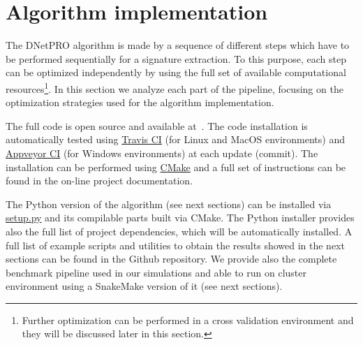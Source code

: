 \documentclass{standalone}
\begin{document}
\section[DNetPRO Implementation]{Algorithm implementation}\label{implementation:implementation}

The \textsf{DNetPRO} algorithm is made by a sequence of different steps which have to be performed sequentially for a signature extraction.
To this purpose, each step can be optimized independently by using the full set of available computational resources\footnote{
  Further optimization can be performed in a cross validation environment and they will be discussed later in this section.
}.
In this section we analyze each part of the pipeline, focusing on the optimization strategies used for the algorithm implementation.

The full code is open source and available at~\cite{DNetPRO}.
The code installation is automatically tested using \href{https://github.com/Nico-Curti/DNetPRO/blob/master/.travis.yml}{\textsf{Travis CI}} (for Linux and MacOS environments) and \href{https://github.com/Nico-Curti/DNetPRO/blob/master/appveyor.yml}{\textsf{Appveyor CI}} (for Windows environments) at each update (commit).
The installation can be performed using \href{https://github.com/Nico-Curti/DNetPRO/blob/master/CMakeLists.txt}{\textsf{CMake}} and a full set of instructions can be found in the on-line project documentation.

The \textsf{Python} version of the algorithm (see next sections) can be installed via \href{https://github.com/Nico-Curti/DNetPRO/blob/master/setup.py}{\textsf{setup.py}} and its compilable parts built via \textsf{CMake}.
The \textsf{Python} installer provides also the full list of project dependencies, which will be automatically installed.
A full list of example scripts and utilities to obtain the results showed in the next sections can be found in the Github repository.
We provide also the complete benchmark pipeline used in our simulations and able to run on cluster environment using a \textsf{SnakeMake} version of it (see next sections).
\end{document}
